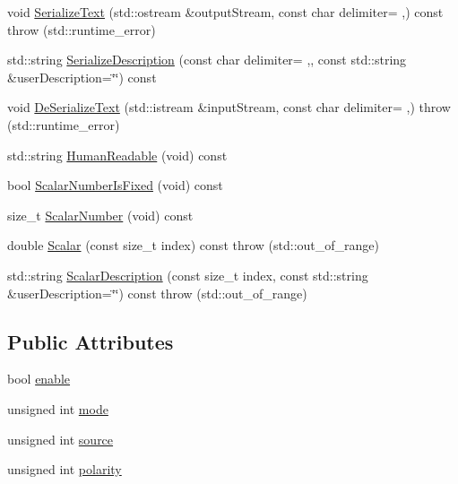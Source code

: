 \begin{DoxyCompactItemize}
\item 
void \hyperlink{classsvl_filter_source_video_capture_types_1_1_external_trigger_a58aa61cfc67b315fc205fe27acef7097}{Serialize\+Text} (std\+::ostream \&output\+Stream, const char delimiter= \textquotesingle{},\textquotesingle{}) const   throw (std\+::runtime\+\_\+error)
\item 
std\+::string \hyperlink{classsvl_filter_source_video_capture_types_1_1_external_trigger_af975c7e888dbce4e9131c8f8a0dbc6cc}{Serialize\+Description} (const char delimiter= \textquotesingle{},\textquotesingle{}, const std\+::string \&user\+Description=\char`\"{}\char`\"{}) const 
\item 
void \hyperlink{classsvl_filter_source_video_capture_types_1_1_external_trigger_aa3c206903b648f6cdce2b15d12fe1730}{De\+Serialize\+Text} (std\+::istream \&input\+Stream, const char delimiter= \textquotesingle{},\textquotesingle{})  throw (std\+::runtime\+\_\+error)
\item 
std\+::string \hyperlink{classsvl_filter_source_video_capture_types_1_1_external_trigger_a96c0d41a941808985245b026da33e50d}{Human\+Readable} (void) const 
\item 
bool \hyperlink{classsvl_filter_source_video_capture_types_1_1_external_trigger_a70aec90cd4e5e774c0772eb0e81934d9}{Scalar\+Number\+Is\+Fixed} (void) const 
\item 
size\+\_\+t \hyperlink{classsvl_filter_source_video_capture_types_1_1_external_trigger_a0745b7e8d52502de9e372b435bd3ac86}{Scalar\+Number} (void) const 
\item 
double \hyperlink{classsvl_filter_source_video_capture_types_1_1_external_trigger_abd8fd72625d87f3e9db9459ebd54dba0}{Scalar} (const size\+\_\+t index) const   throw (std\+::out\+\_\+of\+\_\+range)
\item 
std\+::string \hyperlink{classsvl_filter_source_video_capture_types_1_1_external_trigger_ae0ef010d742bc6d55e9661d7fad0217d}{Scalar\+Description} (const size\+\_\+t index, const std\+::string \&user\+Description=\char`\"{}\char`\"{}) const   throw (std\+::out\+\_\+of\+\_\+range)
\end{DoxyCompactItemize}
\subsection*{Public Attributes}
\begin{DoxyCompactItemize}
\item 
bool \hyperlink{classsvl_filter_source_video_capture_types_1_1_external_trigger_a79a0e5652f004b6b16f759d680bc9e55}{enable}
\item 
unsigned int \hyperlink{classsvl_filter_source_video_capture_types_1_1_external_trigger_ad847cfd7b8858f3e55c4933e0e794eab}{mode}
\item 
unsigned int \hyperlink{classsvl_filter_source_video_capture_types_1_1_external_trigger_a90c5c2fc64176eb2220cdd9890795301}{source}
\item 
unsigned int \hyperlink{classsvl_filter_source_video_capture_types_1_1_external_trigger_a133a895468d169b381e343f3954e81fb}{polarity}
\end{DoxyCompactItemize}


